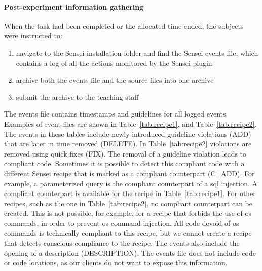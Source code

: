 \paragraph{Post-experiment information gathering}
\label{sec:after}
When the task had been completed or the allocated time ended, the subjects were instructed to:

\begin{enumerate}[noitemsep]
    \item navigate to the Sensei installation folder and find the Sensei events file, which contains a log of all the actions monitored by the Sensei plugin
    \item archive both the events file and the source files into one archive
    \item submit the archive to the teaching staff
\end{enumerate}

The events file contains timestamps and guidelines for all logged events.
Examples of event files are shown in Table~\ref{tab:recipe1}, and Table~\ref{tab:recipe2}.
The events in these tables include newly introduced guideline violations (ADD) that are later in time removed (DELETE).
In Table~\ref{tab:recipe2} violations are removed using quick fixes (FIX).
The removal of a guideline violation leads to compliant code.
Sometimes it is possible to detect this compliant code with a different Sensei recipe that is marked as a compliant counterpart (C\_ADD).
For example, a parameterized query is the compliant counterpart of a \gls{sql} injection.
A compliant counterpart is available for the recipe in Table~\ref{tab:recipe1}.
For other recipes, such as the one in Table~\ref{tab:recipe2}, no compliant counterpart can be created.
This is not possible, for example, for a recipe that forbids the use of \gls{os} commands, in order to prevent \gls{os} command injection.
All code devoid of \gls{os} commands is technically compliant to this recipe, but we cannot create a recipe that detects conscious compliance to the recipe.
The events also include the opening of a description (DESCRIPTION).
The events file does not include code or code locations, as our clients do not want to expose this information.


